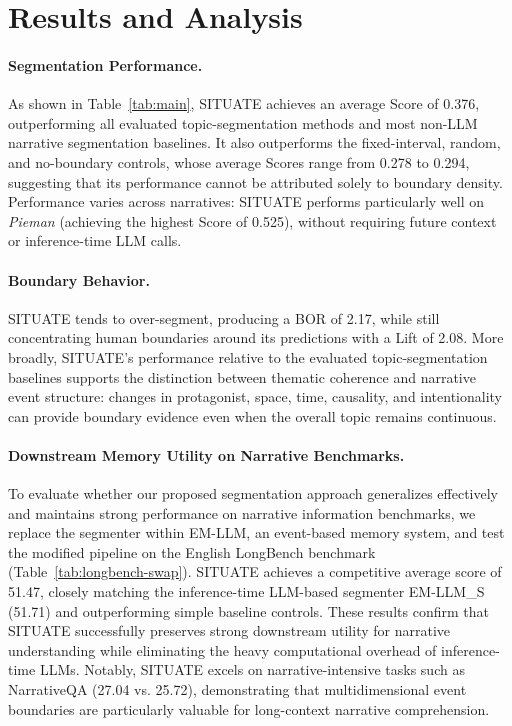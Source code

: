 \documentclass[11pt]{article}
\begin{document}
\section{Results and Analysis}
\label{sec:analysis}
\paragraph{Segmentation Performance.}
As shown in Table~\ref{tab:main}, SITUATE achieves an average Score of 0.376, outperforming all evaluated topic-segmentation methods and most non-LLM narrative segmentation baselines. It also outperforms the fixed-interval, random, and no-boundary controls, whose average Scores range from 0.278 to 0.294, suggesting that its performance cannot be attributed solely to boundary density. Performance varies across narratives: SITUATE performs particularly well on \textit{Pieman} (achieving the highest Score of 0.525), without requiring future context or inference-time LLM calls.

\paragraph{Boundary Behavior.}
SITUATE tends to over-segment, producing a BOR of 2.17, while still concentrating human boundaries around its predictions with a Lift of 2.08. More broadly, SITUATE's performance relative to the evaluated topic-segmentation baselines supports the distinction between thematic coherence and narrative event structure: changes in protagonist, space, time, causality, and intentionality can provide boundary evidence even when the overall topic remains continuous.

\paragraph{Downstream Memory Utility on Narrative Benchmarks.}
To evaluate whether our proposed segmentation approach generalizes effectively and maintains strong performance on narrative information benchmarks, we replace the segmenter within EM-LLM, an event-based memory system, and test the modified pipeline on the English LongBench benchmark (Table~\ref{tab:longbench-swap}). SITUATE achieves a competitive average score of 51.47, closely matching the inference-time LLM-based segmenter EM-LLM\_S (51.71) and outperforming simple baseline controls. These results confirm that SITUATE successfully preserves strong downstream utility for narrative understanding while eliminating the heavy computational overhead of inference-time LLMs. Notably, SITUATE excels on narrative-intensive tasks such as NarrativeQA (27.04 vs. 25.72), demonstrating that multidimensional event boundaries are particularly valuable for long-context narrative comprehension.
\end{document}
